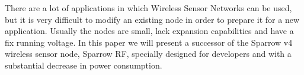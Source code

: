 There are a lot of applications in which Wireless Sensor Networks can be used, but it is very
difficult to modify an existing node in order to prepare it for a new application. Usually the
nodes are small, lack expansion capabilities and have a fix running voltage. In this paper we will
present a successor of the Sparrow v4 wireless sensor node, Sparrow RF, specially designed for developers and with a substantial decrease in power consumption.

